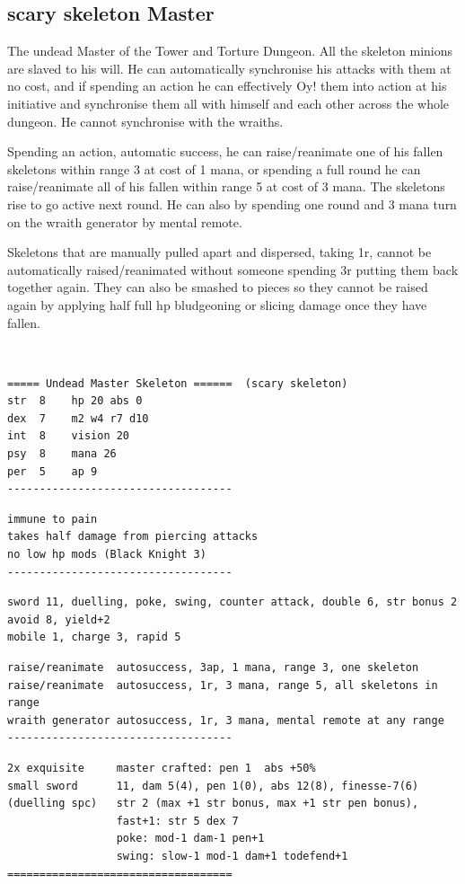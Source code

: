 \goodbreak
\subsection*{scary skeleton Master}
\label{skeletonmaster}

The undead Master of the Tower and Torture Dungeon. All the skeleton minions are slaved to his will. He can automatically synchronise his attacks with them at no cost, and if spending an action he can effectively Oy! them into action at his initiative and synchronise them all with himself and each other across the whole dungeon. He cannot synchronise with the wraiths.

Spending an action, automatic success, he can raise/reanimate one of his fallen skeletons within range 3 at cost of 1 mana, or spending a full round he can raise/reanimate all of his fallen within range 5 at cost of 3 mana. The skeletons rise to go active next round. He can also by spending one round and 3 mana turn on the wraith generator by mental remote.

Skeletons that are manually pulled apart and dispersed, taking 1r, cannot be automatically raised/reanimated without someone spending 3r putting them back together again. They can also be smashed to pieces so they cannot be raised again by applying half full hp bludgeoning or slicing damage once they have fallen.

\

\small \begin{samepage} \begin{verbatim}
===== Undead Master Skeleton ======  (scary skeleton)
str  8    hp 20 abs 0
dex  7    m2 w4 r7 d10
int  8    vision 20
psy  8    mana 26
per  5    ap 9
-----------------------------------
\end{verbatim} \goodbreak \begin{verbatim}
immune to pain
takes half damage from piercing attacks
no low hp mods (Black Knight 3)
-----------------------------------
\end{verbatim} \goodbreak \begin{verbatim}
sword 11, duelling, poke, swing, counter attack, double 6, str bonus 2
avoid 8, yield+2
mobile 1, charge 3, rapid 5 
\end{verbatim} \goodbreak \begin{verbatim}
raise/reanimate  autosuccess, 3ap, 1 mana, range 3, one skeleton
raise/reanimate  autosuccess, 1r, 3 mana, range 5, all skeletons in range
wraith generator autosuccess, 1r, 3 mana, mental remote at any range
-----------------------------------
\end{verbatim} \goodbreak \begin{verbatim}
2x exquisite     master crafted: pen 1  abs +50%
small sword      11, dam 5(4), pen 1(0), abs 12(8), finesse-7(6)
(duelling spc)   str 2 (max +1 str bonus, max +1 str pen bonus),
                 fast+1: str 5 dex 7
                 poke: mod-1 dam-1 pen+1
                 swing: slow-1 mod-1 dam+1 todefend+1
===================================
\end{verbatim} \end{samepage} \normalsize

